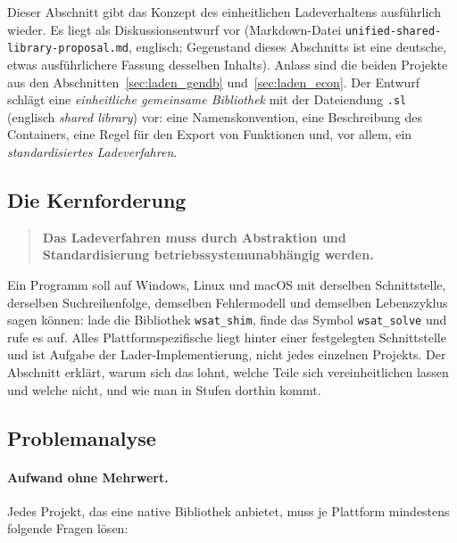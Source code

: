Dieser Abschnitt gibt das Konzept des einheitlichen Ladeverhaltens ausführlich wieder. Es liegt als Diskussionsentwurf vor (Markdown-Datei \texttt{unified-shared-library-proposal.md}, englisch; Gegenstand dieses Abschnitts ist eine deutsche, etwas ausführlichere Fassung desselben Inhalts). Anlass sind die beiden Projekte aus den Abschnitten~\ref{sec:laden_gendb} und~\ref{sec:laden_econ}. Der Entwurf schlägt eine \emph{einheitliche gemeinsame Bibliothek} mit der Dateiendung \texttt{.sl} (englisch \emph{shared library}) vor: eine Namenskonvention, eine Beschreibung des Containers, eine Regel für den Export von Funktionen und, vor allem, ein \emph{standardisiertes Ladeverfahren}.

\subsection{Die Kernforderung}

\begin{quote}
	\textbf{Das Ladeverfahren muss durch Abstraktion und Standardisierung betriebssystemunabhängig werden.}
\end{quote}

Ein Programm soll auf Windows, Linux und macOS mit derselben Schnittstelle, derselben Suchreihenfolge, demselben Fehlermodell und demselben Lebenszyklus sagen können: \glqq lade die Bibliothek \texttt{wsat\_shim}, finde das Symbol \texttt{wsat\_solve} und rufe es auf\grqq. Alles Plattformspezifische liegt hinter einer festgelegten Schnittstelle und ist Aufgabe der Lader-Implementierung, nicht jedes einzelnen Projekts. Der Abschnitt erklärt, warum sich das lohnt, welche Teile sich vereinheitlichen lassen und welche nicht, und wie man in Stufen dorthin kommt.

\subsection{Problemanalyse}

\paragraph{Aufwand ohne Mehrwert.} Jedes Projekt, das eine native Bibliothek anbietet, muss je Plattform mindestens folgende Fragen lösen:

